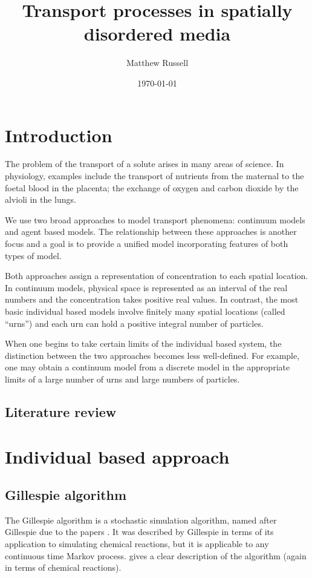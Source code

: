 \documentclass[a4paper,11pt]{report}
\title{Transport processes in spatially disordered media}
\author{Matthew Russell}
\date{\today}
\numberwithin{equation}{section}
\begin{document}
\maketitle

\tableofcontents

\chapter{Introduction}
The problem of the transport of a solute arises in many areas of science. In
physiology, examples include the transport of nutrients from the maternal to the
foetal blood in the placenta; the exchange of oxygen and carbon dioxide by the
alvioli in the lungs. 

We use two broad approaches to model transport phenomena: continuum models and
agent based models. The relationship between these approaches is another focus
and a goal is to provide a unified model incorporating features of both types of
model.

Both approaches assign a representation of concentration to each
spatial location. In continuum models, physical space is represented as an
interval of the real numbers and the concentration takes positive real values.
In contrast, the most basic individual based models involve finitely many
spatial locations (called ``urns'') and each urn can hold a positive integral
number of particles.

When one begins to take certain limits of the individual based system, the
distinction between the two approaches becomes less well-defined. For example,
one may obtain a continuum model from a discrete model in the appropriate limits
of a large number of urns and large numbers of particles. 

\section{Literature review}

\chapter{Individual based approach}

\section{Gillespie algorithm}
The Gillespie algorithm is a stochastic simulation algorithm, named after
Gillespie due to the papers \cite{gillespie1976general,gillespie1977exact}. It
was described by Gillespie in terms of its application to simulating chemical
reactions, but it is applicable to any continuous time Markov process.
\cite{anderson2007modified} gives a clear description of the algorithm (again in
terms of chemical reactions).
\end{document}
